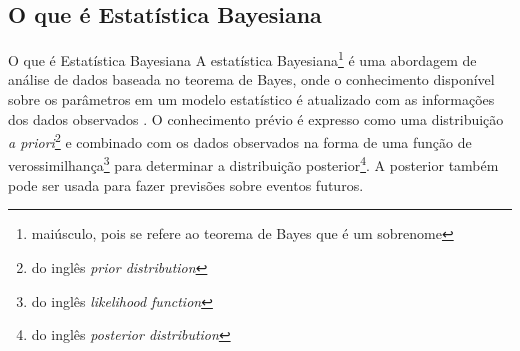 \subsection{O que é Estatística Bayesiana}
\begin{frame}{O que é Estatística Bayesiana}
    A estatística Bayesiana\footnote{maiúsculo, pois se refere ao teorema de Bayes que é um sobrenome}
    é uma abordagem de análise de dados baseada no teorema de Bayes,
    onde o conhecimento disponível sobre os parâmetros em um modelo estatístico
    é atualizado com as informações dos dados observados
    \parencite{gelman2013bayesian}. O conhecimento prévio é expresso como
    uma distribuição
    \textit{a priori}\footnote{do inglês \foreignlanguage{english}{\textit{prior distribution}}}
    e combinado com os dados observados na forma de uma função de
    verossimilhança\footnote{do inglês \foreignlanguage{english}{\textit{likelihood function}}}
    para determinar a distribuição
    posterior\footnote{\foreignlanguage{english}{do inglês \textit{posterior distribution}}}.
    A posterior também pode ser usada para fazer previsões sobre eventos futuros.
\end{frame}

